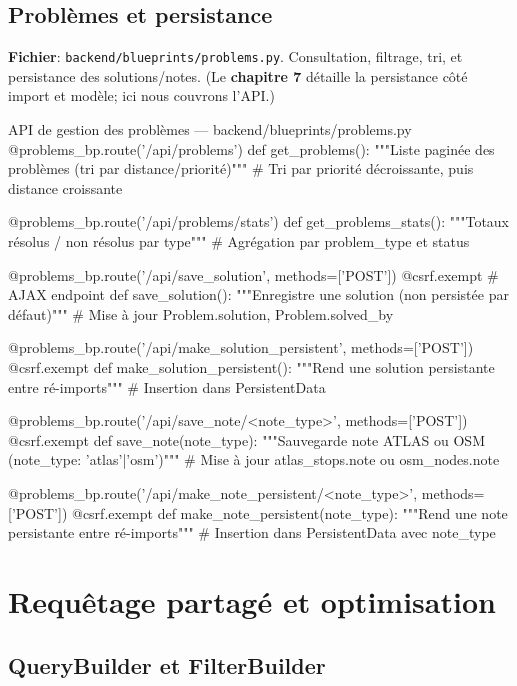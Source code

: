 \subsection{Problèmes et persistance}

\textbf{Fichier}: \texttt{backend/blueprints/problems.py}. Consultation, filtrage, tri, et persistance des solutions/notes. (Le \textbf{chapitre 7} détaille la persistance côté import et modèle; ici nous couvrons l'API.)

\begin{codebox}[language=Python]{API de gestion des problèmes — backend/blueprints/problems.py}
@problems_bp.route('/api/problems')
def get_problems():
    """Liste paginée des problèmes (tri par distance/priorité)"""
    # Tri par priorité décroissante, puis distance croissante

@problems_bp.route('/api/problems/stats')
def get_problems_stats():
    """Totaux résolus / non résolus par type"""
    # Agrégation par problem_type et status

@problems_bp.route('/api/save_solution', methods=['POST'])
@csrf.exempt  # AJAX endpoint
def save_solution():
    """Enregistre une solution (non persistée par défaut)"""
    # Mise à jour Problem.solution, Problem.solved_by

@problems_bp.route('/api/make_solution_persistent', methods=['POST'])
@csrf.exempt
def make_solution_persistent():
    """Rend une solution persistante entre ré-imports"""
    # Insertion dans PersistentData

@problems_bp.route('/api/save_note/<note_type>', methods=['POST'])
@csrf.exempt
def save_note(note_type):
    """Sauvegarde note ATLAS ou OSM (note_type: 'atlas'|'osm')"""
    # Mise à jour atlas_stops.note ou osm_nodes.note

@problems_bp.route('/api/make_note_persistent/<note_type>', methods=['POST'])
@csrf.exempt
def make_note_persistent(note_type):
    """Rend une note persistante entre ré-imports"""
    # Insertion dans PersistentData avec note_type
\end{codebox}

\section{Requêtage partagé et optimisation}

\subsection*{QueryBuilder et FilterBuilder}

